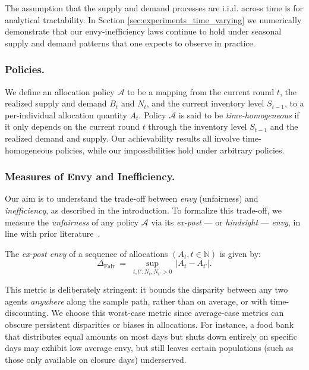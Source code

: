 \documentclass[mnsc,nonblindrev]{informs3}
\newcommand{\N}{\mathbb{N}}
\newcommand{\Dfair}{\Delta_{\text{Fair}}\xspace}
\renewcommand{\paragraph}[1]{\subsubsection*{#1}}
\begin{document}
\begin{remark}
The assumption that the supply and demand processes are i.i.d. across time is for analytical tractability. In Section \ref{sec:experiments_time_varying} we numerically demonstrate that our envy-inefficiency laws continue to hold under seasonal supply and demand patterns that one expects to observe in practice.
\end{remark}

\paragraph{Policies.} We define an allocation policy $\mathcal{A}$ to be a mapping from the current round $t$, the realized supply and demand $B_t$ and $N_t$, and the current inventory level $S_{t-1}$, to a per-individual allocation quantity $A_t$.
Policy $\mathcal{A}$ is said to be {\it time-homogeneous} if 
it only depends on the current round $t$ through the inventory level $S_{t-1}$ and the realized demand and supply. 
Our achievability results all involve time-homogeneous policies, while our impossibilities hold under arbitrary policies.

\paragraph{Measures of Envy and Inefficiency.}  Our aim is to understand the trade-off between {\it envy} (unfairness) and {\it inefficiency}, as described in the introduction. 
To formalize this trade-off, we measure the {\it unfairness} of any policy $\mathcal{A}$ via its \emph{ex-post} --- or {\it hindsight} --- {\it envy}, in line with prior literature~\citep{varian1973equity,sinclair2021sequential,banerjee2024online}.
\begin{definition}
\label{def:fairness}
The \emph{ex-post envy} of a sequence of allocations $(A_t, t\in \N)$ is given by:
\begin{equation}
\Dfair \;=\; \sup_{t,t': N_t, N_{t'} > 0} \, |A_t - A_{t’}|.
\end{equation}
\end{definition}

This metric is deliberately stringent: it bounds the disparity between any two agents \emph{anywhere} along the sample path, rather than on average, or with time-discounting. We choose this worst-case metric since average-case metrics can obscure persistent disparities or biases in allocations.  For instance, a food bank that distributes equal amounts on most days but shuts down entirely on specific days may exhibit low average envy, but still leaves certain populations (such as those only available on closure days) underserved.
\end{document}
